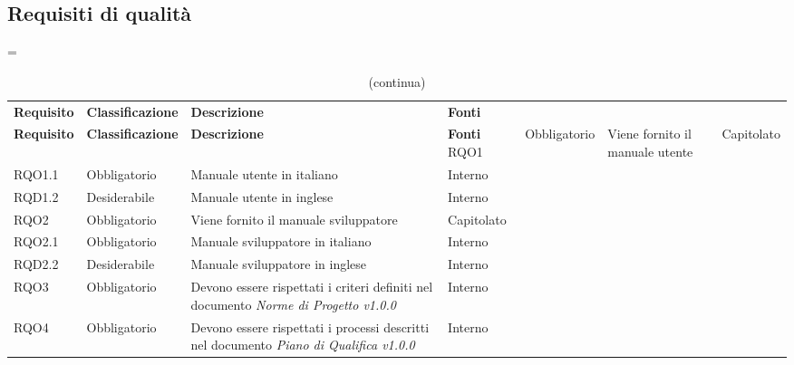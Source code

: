 \subsection{Requisiti di qualità}

\LTcapwidth=\linewidth
\begin{longtable}{ >{\centering}p{} >{\centering}p{}
		>{\raggedright}p{} >{\centering}p{}}
	\caption{Tabella dei requisiti di qualità}\\
	\rowcolorhead 
	\textbf{\color{white}Requisito} 
	& \textbf{\color{white}Classificazione} 
	& \centering\textbf{\color{white}Descrizione}
	& \textbf{\color{white}Fonti} 
	\endfirsthead
	\caption[]{(continua)}\\
	\rowcolorhead 
	\textbf{\color{white}Requisito} 
	& \textbf{\color{white}Classificazione} 
	& \centering\textbf{\color{white}Descrizione}
	& \textbf{\color{white}Fonti} 
	\endhead
	RQO1	&	Obbligatorio	&	Viene fornito il manuale utente	&	Capitolato	\tabularnewline
	RQO1.1	&	Obbligatorio	&	Manuale utente in italiano	&	Interno	\tabularnewline
	RQD1.2	&	Desiderabile	&	Manuale utente in inglese	&	Interno	\tabularnewline
	RQO2	&	Obbligatorio	&	Viene fornito il manuale sviluppatore	&	Capitolato	\tabularnewline
	RQO2.1	&	Obbligatorio	&		Manuale sviluppatore in italiano	&	Interno	\tabularnewline
	RQD2.2	&	Desiderabile	&		Manuale sviluppatore in inglese	&	Interno	\tabularnewline
	RQO3	&	Obbligatorio	&		Devono essere rispettati i criteri definiti nel documento \textit{Norme di Progetto v1.0.0}	&	Interno	\tabularnewline
	RQO4	& Obbligatorio	& 	Devono essere rispettati i processi descritti nel documento \textit{Piano di Qualifica v1.0.0} &	Interno \tabularnewline
	
\end{longtable}
	

